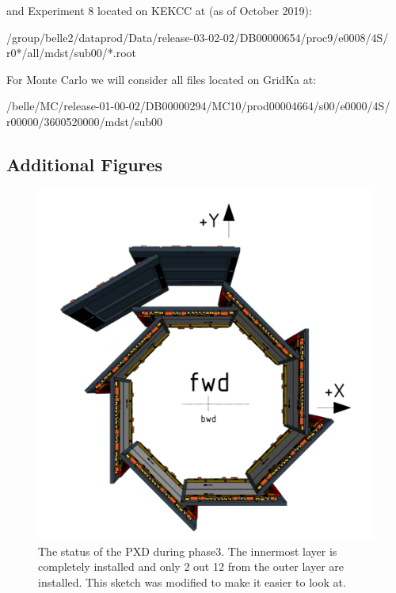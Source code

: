 \documentclass[a4paper,11pt,twosided,final,german,openbib,pdftex,listof=totoc,bibliography=totoc]{scrbook}
\begin{document}
\begin{appendix}
and Experiment 8 located on KEKCC at (as of October 2019):
\newline

/group/belle2/dataprod/Data/release-03-02-02/DB00000654/proc9/e0008/4S/
r0*/all/mdst/sub00/*.root
\newline

For Monte Carlo we will consider all files located on GridKa at:
\newline 

/belle/MC/release-01-00-02/DB00000294/MC10/prod00004664/s00/e0000/4S/
r00000/3600520000/mdst/sub00
\newline


\subsection{Additional Figures}



\begin{figure}[h!]
	\centering
	\includegraphics[width=\textwidth]{Bilder/phase3pxd.pdf}
	\caption[The Status Of The PXD In Phase3]{The status of the PXD during phase3. The innermost layer is completely installed and only 2 out 12 from the outer layer are installed. This sketch was modified to make it easier to look at.\cite{phase3pxd}}
	\label{fig:phase3pxd}
\end{figure}










\end{appendix}
\end{document}
